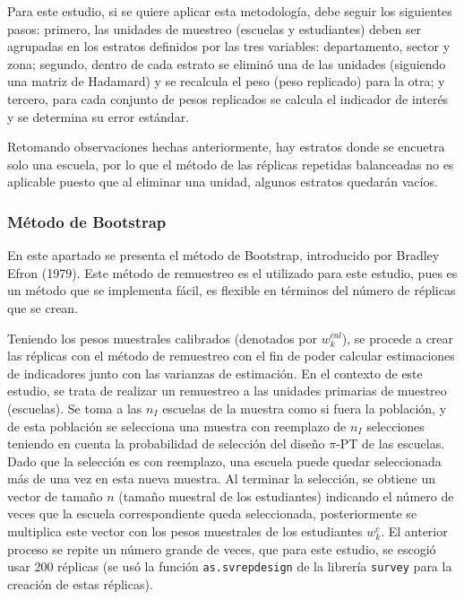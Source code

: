 \documentclass[
  12pt,
  spanish,
]{book}
\begin{document}
Para este estudio, si se quiere aplicar esta metodología, debe seguir los siguientes pasos: primero, las unidades de muestreo (escuelas y estudiantes) deben ser agrupadas en los estratos definidos por las tres variables: departamento, sector y zona; segundo, dentro de cada estrato se eliminó una de las unidades (siguiendo una matriz de Hadamard) y se recalcula el peso (peso replicado) para la otra; y tercero, para cada conjunto de pesos replicados se calcula el indicador de interés y se determina su error estándar.

Retomando observaciones hechas anteriormente, hay estratos donde se encuetra solo una escuela, por lo que el método de las réplicas repetidas balanceadas no es aplicable puesto que al eliminar una unidad, algunos estratos quedarán vacíos.

\hypertarget{muxe9todo-de-bootstrap}{%
\subsubsection*{Método de Bootstrap}\label{muxe9todo-de-bootstrap}}

En este apartado se presenta el método de Bootstrap, introducido por Bradley Efron (1979). Este método de remuestreo es el utilizado para este estudio, pues es un método que se implementa fácil, es flexible en términos del número de réplicas que se crean.

Teniendo los pesos muestrales calibrados (denotados por \(w_k^{cal}\)), se procede a crear las réplicas con el método de remuestreo con el fin de poder calcular estimaciones de indicadores junto con las varianzas de estimación. En el contexto de este estudio, se trata de realizar un remuestreo a las unidades primarias de muestreo (escuelas). Se toma a las \(n_I\) escuelas de la muestra como si fuera la población, y de esta población se selecciona una muestra con reemplazo de \(n_I\) selecciones teniendo en cuenta la probabilidad de selección del diseño \(\pi\)-PT de las escuelas. Dado que la selección es con reemplazo, una escuela puede quedar seleccionada más de una vez en esta nueva muestra. Al terminar la selección, se obtiene un vector de tamaño \(n\) (tamaño muestral de los estudiantes) indicando el número de veces que la escuela correspondiente queda seleccionada, posteriormente se multiplica este vector con los pesos muestrales de los estudiantes \(w_k^c\). El anterior proceso se repite un número grande de veces, que para este estudio, se escogió usar 200 réplicas (se usó la función \texttt{as.svrepdesign} de la librería \texttt{survey} para la creación de estas réplicas).
\end{document}

